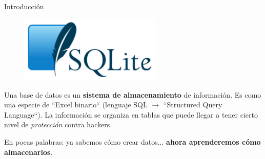 \begin{frame}[t]{Introducción}\vspace{10pt}

\begin{figure}
\centering
\includegraphics[width=0.6\textwidth]{Images/sqlite.PNG}
\end{figure}

Una base de datos es un \textbf{sistema de almacenamiento} de información. Es como una especie de ``Excel binario`` (lenguaje SQL $\rightarrow$ ``Structured Query Language``). La información se organiza en tablas que puede llegar a tener cierto nivel de \textit{protección} contra hackers.

\vspace{5pt}

En pocas palabras: ya sabemos cómo crear datos... \textbf{ahora aprenderemos cómo almacenarlos}.

\end{frame}